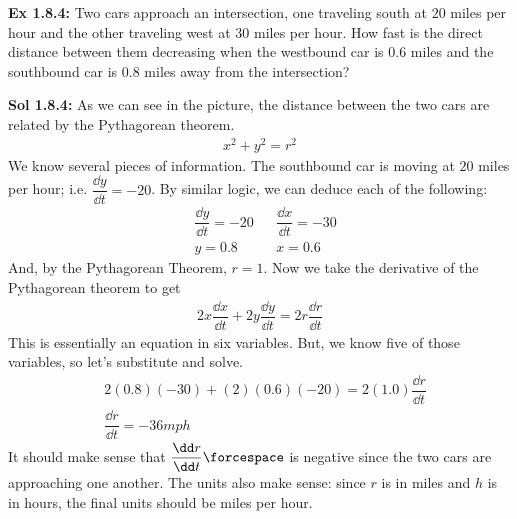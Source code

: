 \begin{tcolorbox}[example]
    \textbf{Ex 1.8.4: } Two cars approach an intersection, one traveling south at $20$ miles per hour and the other traveling west at $30$ miles per hour. How fast is the direct distance between them decreasing when the westbound car is $0.6$ miles and the southbound car is $0.8$ miles away from the intersection? \\[11pt]

    \begin{center}
    \end{center}
\end{tcolorbox}
\begin{tcolorbox}[solution]
    \textbf{Sol 1.8.4: } As we can see in the picture, the distance between the two cars are related by the Pythagorean theorem. \begin{align*}
        x^2 + y^2 = r^2
    \end{align*}
    We know several pieces of information. The southbound car is moving at $20$ miles per hour; i.e. $\dfrac{\dd y}{\dd t} = -20$. By similar logic, we can deduce each of the following: \begin{align*}
        & \dfrac{\dd y}{\dd t} = -20 && \dfrac{\dd x}{\dd t} = -30 \\[11pt]
        & y = 0.8 && x = 0.6
    \end{align*}
    And, by the Pythagorean Theorem, $r = 1$. Now we take the derivative of the Pythagorean theorem to get \begin{align*}
        2x\dfrac{\dd x}{\dd t} + 2y\dfrac{\dd y}{\dd t} = 2r\dfrac{\dd r}{\dd t}
    \end{align*}
    This is essentially an equation in six variables. But, we know five of those variables, so let's substitute and solve. \begin{align*}
        & 2(0.8)(-30) + (2)(0.6)(-20) = 2(1.0)\dfrac{\dd r}{\dd t} \\[11pt]
        & \dfrac{\dd r}{\dd t} = \boxed{-36 \si{mph}}
    \end{align*}
    It should make sense that $\dfrac{\dd r}{\dd t} \forcespace$ is negative since the two cars are approaching one another. The units also make sense: since $r$ is in miles and $h$ is in hours, the final units should be miles per hour.
\end{tcolorbox}

